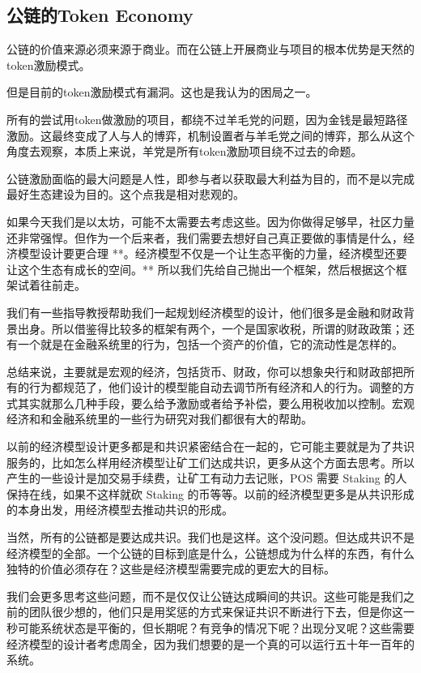 \subsection{公链的Token Economy}

公链的价值来源必须来源于商业。而在公链上开展商业与项目的根本优势是天然的token激励模式。

但是目前的token激励模式有漏洞。这也是我认为的困局之一。

所有的尝试用token做激励的项目，都绕不过羊毛党的问题，因为金钱是最短路径激励。这最终变成了人与人的博弈，机制设置者与羊毛党之间的博弈，那么从这个角度去观察，本质上来说，羊党是所有token激励项目绕不过去的命题。

公链激励面临的最大问题是人性，即参与者以获取最大利益为目的，而不是以完成最好生态建设为目的。这个点我是相对悲观的。

如果今天我们是以太坊，可能不太需要去考虑这些。因为你做得足够早，社区力量还非常强悍。但作为一个后来者，我们需要去想好自己真正要做的事情是什么，经济模型设计要更合理 **。经济模型不仅是一个让生态平衡的力量，经济模型还要让这个生态有成长的空间。** 所以我们先给自己抛出一个框架，然后根据这个框架试着往前走。

我们有一些指导教授帮助我们一起规划经济模型的设计，他们很多是金融和财政背景出身。所以借鉴得比较多的框架有两个，一个是国家收税，所谓的财政政策；还有一个就是在金融系统里的行为，包括一个资产的价值，它的流动性是怎样的。

总结来说，主要就是宏观的经济，包括货币、财政，你可以想象央行和财政部把所有的行为都规范了，他们设计的模型能自动去调节所有经济和人的行为。调整的方式其实就那么几种手段，要么给予激励或者给予补偿，要么用税收加以控制。宏观经济和和金融系统里的一些行为研究对我们都很有大的帮助。

以前的经济模型设计更多都是和共识紧密结合在一起的，它可能主要就是为了共识服务的，比如怎么样用经济模型让矿工们达成共识，更多从这个方面去思考。所以产生的一些设计是加交易手续费，让矿工有动力去记账，POS 需要 Staking 的人保持在线，如果不这样就砍 Staking 的币等等。以前的经济模型更多是从共识形成的本身出发，用经济模型去推动共识的形成。

当然，所有的公链都是要达成共识。我们也是这样。这个没问题。但达成共识不是经济模型的全部。一个公链的目标到底是什么，公链想成为什么样的东西，有什么独特的价值必须存在？这些是经济模型需要完成的更宏大的目标。


我们会更多思考这些问题，而不是仅仅让公链达成瞬间的共识。这些可能是我们之前的团队很少想的，他们只是用奖惩的方式来保证共识不断进行下去，但是你这一秒可能系统状态是平衡的，但长期呢？有竞争的情况下呢？出现分叉呢？这些需要经济模型的设计者考虑周全，因为我们想要的是一个真的可以运行五十年一百年的系统。

